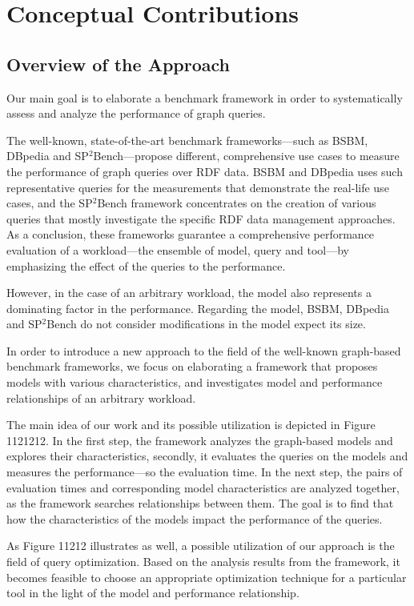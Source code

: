\chapter{Conceptual Contributions}

\section{Overview of the Approach}

Our main goal is to elaborate a benchmark framework in order to systematically assess and analyze the performance of graph queries.

The well-known, state-of-the-art benchmark frameworks---such as BSBM, DBpedia and SP$^2$Bench---propose different, comprehensive use cases to measure the performance of graph queries over RDF data. BSBM and DBpedia uses such representative queries for the measurements that demonstrate the real-life use cases, and the SP$^2$Bench framework concentrates on the creation of various queries that mostly investigate the specific RDF data management approaches. As a conclusion, these frameworks guarantee a comprehensive performance evaluation of a workload---the ensemble of model, query and tool---by emphasizing the effect of the queries to the performance.

However, in the case of an arbitrary workload, the model also represents a dominating factor in the performance. Regarding the model, BSBM, DBpedia and SP$^2$Bench do not consider modifications in the model expect its size.

In order to introduce a new approach to the field of the well-known graph-based benchmark frameworks, we focus on elaborating a framework that proposes models with various characteristics, and investigates model and performance relationships of an arbitrary workload.

The main idea of our work and its possible utilization is depicted in Figure 1121212.%
In the first step, the framework analyzes the graph-based models and explores their characteristics, secondly, it evaluates the queries on the models and measures the performance---so the evaluation time. In the next step, the pairs of evaluation times and corresponding model characteristics are analyzed together, as the framework searches relationships between them. The goal is to find that how the characteristics of the models impact the performance of the queries.

As Figure 11212 %
illustrates as well, a possible utilization of our approach is the field of query optimization. Based on the analysis results from the framework, it becomes feasible to choose an appropriate optimization technique for a particular tool in the light of the model and performance relationship.

